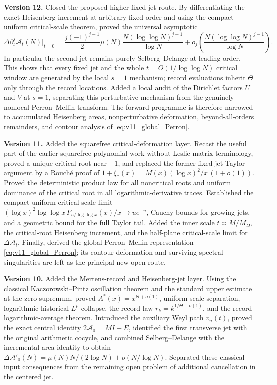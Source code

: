 \documentclass[11pt]{amsart}
\numberwithin{equation}{section}
\theoremstyle{plain}
\theoremstyle{definition}
\theoremstyle{remark}
\begin{document}
\noindent\textbf{Version 12.}
Closed the proposed higher-fixed-jet route.  By differentiating the exact
Heisenberg increment at arbitrary fixed order and using the compact-uniform
critical-scale theorem, proved the universal asymptotic
\[
\Delta\partial_t^j\mathcal A_t(N)|_{t=0}
=\frac{j(-1)^{j-1}}2\mu(N)
\frac{N(\log\log N)^{j-1}}{\log N}
+o_j\!\left(\frac{N(\log\log N)^{j-1}}{\log N}\right).
\]
In particular the second jet remains purely Selberg--Delange at leading
order.  This shows that every fixed jet and the whole
\(t=O(1/\log\log N)\) critical window are generated by the local
\(s=1\) mechanism; record evaluations inherit \(\Theta\) only through the
record locations.  Added a local audit of the Dirichlet factors \(U\) and
\(V\) at \(s=1\), separating this perturbative mechanism from the genuinely
nonlocal Perron--Mellin transform.  The forward programme is therefore narrowed
to accumulated Heisenberg areas, nonperturbative deformation, beyond-all-orders
remainders, and contour analysis of \eqref{eq:v11_global_Perron}.

\noindent\textbf{Version 11.}
Added the squarefree critical-deformation layer.  Recast the useful part of
the earlier squarefree-polynomial work without Leslie-matrix terminology,
proved a unique critical root near \(-1\), and replaced the former fixed-jet
Taylor argument by a Rouch\'e proof of
\(1+\xi_*(x)=M(x)(\log x)^2/x\,(1+o(1))\).  Proved the deterministic product
law for all noncritical roots and uniform dominance of the critical root in
all logarithmic-derivative traces.  Established the compact-uniform
critical-scale limit
\((\log x)^2\log\log x\,F_{u/\log\log x}(x)/x\to ue^{-u}\), Cauchy bounds for
growing jets, and a geometric bound for the full Taylor tail.  Added the
inner scale \(t\asymp M/M_\Omega\), the critical-root Heisenberg increment,
and the half-plane critical-scale limit for \(\Delta\mathcal A_t\).  Finally,
derived the global Perron--Mellin representation
\eqref{eq:v11_global_Perron}; its contour deformation and surviving spectral
singularities are left as the principal new open route.

\noindent\textbf{Version 10.}
Added the Mertens-record and Heisenberg-jet layer.  Using the classical
Kaczorowski--Pintz oscillation theorem and the standard upper estimate at the
zero supremum, proved \(A^*(x)=x^{\Theta+o(1)}\), uniform scale separation,
logarithmic historical \(L^p\)-collapse, the record law
\(r_k=k^{1/\Theta+o(1)}\), and the record logarithmic-average theorem.
Introduced the auxiliary Weyl path \(v_n(t)\), proved the exact central identity
\(2\mathcal A_0=MI-E\), identified the first transverse jet with the original
arithmetic cocycle, and combined Selberg--Delange with the incremental area
identity to obtain
\(\Delta\mathcal A'_0(N)=\mu(N)N/(2\log N)+o(N/\log N)\).
Separated these classical-input consequences from the remaining open problem
of additional cancellation in the centered jet.
\end{document}
